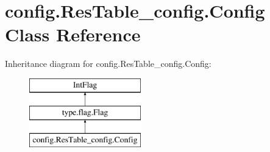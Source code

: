 \hypertarget{classconfig_1_1ResTable__config_1_1Config}{}\section{config.\+Res\+Table\+\_\+config.\+Config Class Reference}
\label{classconfig_1_1ResTable__config_1_1Config}
Inheritance diagram for config.\+Res\+Table\+\_\+config.\+Config\+:\begin{figure}[H]
\begin{center}
\leavevmode
\includegraphics[height=3.000000cm]{classconfig_1_1ResTable__config_1_1Config}
\end{center}
\end{figure}
